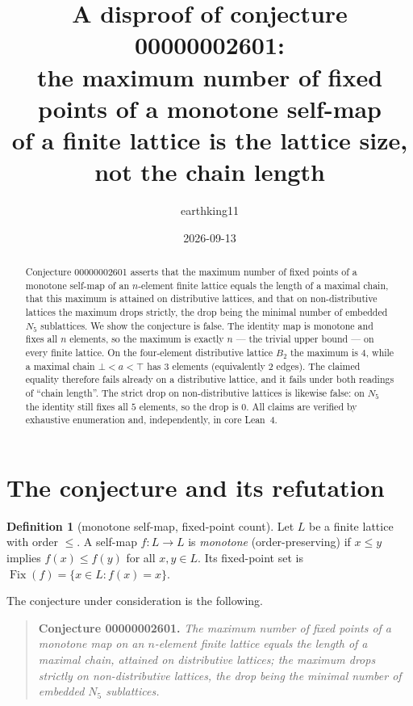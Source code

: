 \documentclass[11pt]{article}
\title{A disproof of conjecture 00000002601:\\
the maximum number of fixed points of a monotone self-map\\
of a finite lattice is the lattice size, not the chain length}
\author{earthking11}
\date{2026-09-13}
\theoremstyle{definition}
\newtheorem{definition}[theorem]{Definition}
\newcommand{\Fix}{\operatorname{Fix}}
\begin{document}
\maketitle

\begin{abstract}
Conjecture 00000002601 asserts that the maximum number of fixed points of a
monotone self-map of an $n$-element finite lattice equals the length of a
maximal chain, that this maximum is attained on distributive lattices, and
that on non-distributive lattices the maximum drops strictly, the drop being
the minimal number of embedded $N_5$ sublattices. We show the conjecture is
false. The identity map is monotone and fixes all $n$ elements, so the maximum
is exactly $n$ --- the trivial upper bound --- on every finite lattice. On the
four-element distributive lattice $B_2$ the maximum is $4$, while a maximal
chain $\bot < a < \top$ has $3$ elements (equivalently $2$ edges). The claimed
equality therefore fails already on a distributive lattice, and it fails under
both readings of ``chain length''. The strict drop on non-distributive
lattices is likewise false: on $N_5$ the identity still fixes all $5$
elements, so the drop is $0$. All claims are verified by exhaustive
enumeration and, independently, in core Lean~4.
\end{abstract}

\section{The conjecture and its refutation}

\begin{definition}[monotone self-map, fixed-point count]
Let $L$ be a finite lattice with order $\le$. A self-map $f \colon L \to L$ is
\emph{monotone} (order-preserving) if $x \le y$ implies $f(x) \le f(y)$ for all
$x,y \in L$. Its fixed-point set is $\Fix(f) = \{x \in L : f(x) = x\}$.
\end{definition}

The conjecture under consideration is the following.

\begin{quote}
\textbf{Conjecture 00000002601.} \emph{The maximum number of fixed points of a
monotone map on an $n$-element finite lattice equals the length of a maximal
chain, attained on distributive lattices; the maximum drops strictly on
non-distributive lattices, the drop being the minimal number of embedded $N_5$
sublattices.}
\end{quote}
\end{document}
